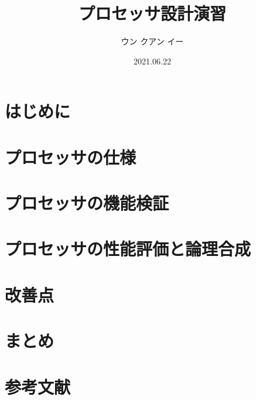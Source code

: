 \documentclass[a4paper, 12pt]{jsarticle}
\title{プロセッサ設計演習}
\author{ウン クアン イー}
\date{2021.06.22}
\begin{document}
  
  \maketitle

  \section{はじめに}
  

  \section{プロセッサの仕様}
  

  \section{プロセッサの機能検証}
  

  \section{プロセッサの性能評価と論理合成}
  

  \section{改善点}
  

  \section{まとめ}
  

  \section*{参考文献}
  
\end{document}
